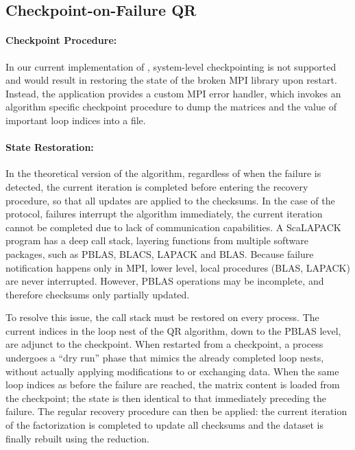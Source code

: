 \subsection{Checkpoint-on-Failure QR}

\paragraph*{Checkpoint Procedure:} In our current implementation of
\cof, system-level checkpointing is not supported and would result in
restoring the state of the broken MPI library upon restart. Instead, the
application provides a custom MPI error handler, which invokes an
algorithm specific checkpoint procedure to dump the matrices and the
value of important loop indices into a file.

\paragraph*{State Restoration:} In the theoretical version of the \abft
algorithm, regardless of when the failure is detected, the current
iteration is completed before entering the recovery procedure, so that
all updates are applied to the checksums. In the case of the \cof
protocol, failures interrupt the algorithm immediately, the current
iteration cannot be completed due to lack of communication capabilities.
A ScaLAPACK program has a deep call stack, layering functions from
multiple software packages, such as PBLAS, BLACS, LAPACK and BLAS.
Because failure notification happens only in MPI, lower level, local
procedures (BLAS, LAPACK) are never interrupted. However, PBLAS
operations may be incomplete, and therefore checksums only partially
updated.

To resolve this issue, the call stack must be restored on every process.
The current indices in the loop nest of the QR algorithm, down to the
PBLAS level, are adjunct to the checkpoint. When restarted from a
checkpoint, a process undergoes a ``dry run'' phase that mimics the
already completed loop nests, without actually applying modifications to
or exchanging data. When the same loop indices as before the failure are
reached, the matrix content is loaded from the checkpoint; the state is
then identical to that immediately preceding the failure. The regular
\abft recovery procedure can then be applied: the current iteration of
the factorization is completed to update all checksums and the dataset
is finally rebuilt using the \abft reduction.

